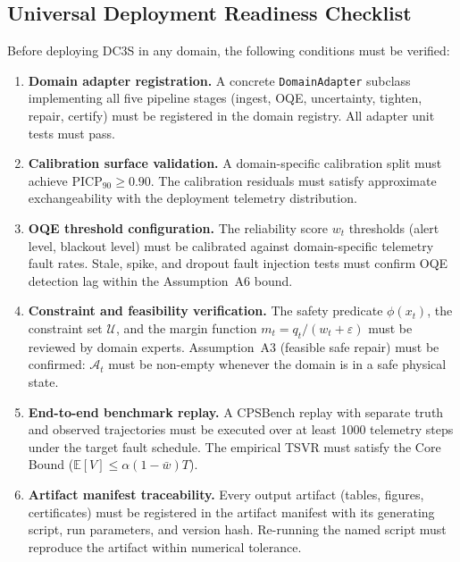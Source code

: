 \subsection{Universal Deployment Readiness Checklist}

Before deploying DC3S in any domain, the following conditions must be
verified:

\begin{enumerate}
  \item \textbf{Domain adapter registration.}  A concrete \texttt{DomainAdapter}
    subclass implementing all five pipeline stages (ingest, OQE, uncertainty,
    tighten, repair, certify) must be registered in the domain registry.
    All adapter unit tests must pass.

  \item \textbf{Calibration surface validation.}  A domain-specific calibration
    split must achieve $\mathrm{PICP}_{90} \ge 0.90$.  The calibration
    residuals must satisfy approximate exchangeability with the deployment
    telemetry distribution.

  \item \textbf{OQE threshold configuration.}  The reliability score $w_t$
    thresholds (alert level, blackout level) must be calibrated against
    domain-specific telemetry fault rates.  Stale, spike, and dropout
    fault injection tests must confirm OQE detection lag within the
    Assumption~A6 bound.

  \item \textbf{Constraint and feasibility verification.}  The safety predicate
    $\phi(x_t)$, the constraint set $\mathcal{U}$, and the margin function
    $m_t = q_t / (w_t + \varepsilon)$ must be reviewed by domain experts.
    Assumption~A3 (feasible safe repair) must be confirmed: $\mathcal{A}_t$
    must be non-empty whenever the domain is in a safe physical state.

  \item \textbf{End-to-end benchmark replay.}  A CPSBench replay with separate
    truth and observed trajectories must be executed over at least 1000
    telemetry steps under the target fault schedule.  The empirical TSVR
    must satisfy the Core Bound ($\mathbb{E}[V] \le \alpha(1-\bar{w})T$).

  \item \textbf{Artifact manifest traceability.}  Every output artifact
    (tables, figures, certificates) must be registered in the artifact
    manifest with its generating script, run parameters, and version hash.
    Re-running the named script must reproduce the artifact within numerical
    tolerance.
\end{enumerate}

